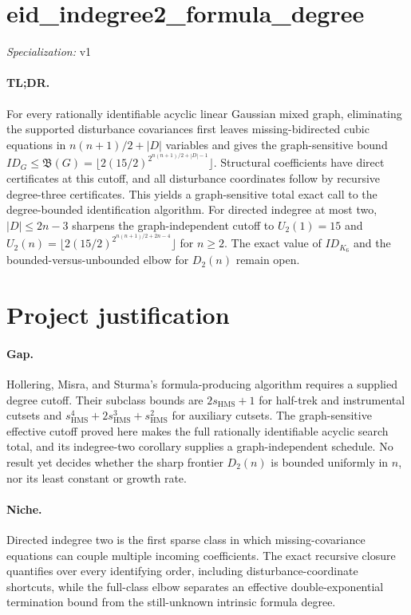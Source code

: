 \documentclass{article}
\begin{document}
\sloppy

\section*{eid\_\allowbreak{}indegree2\_\allowbreak{}formula\_\allowbreak{}degree}

\noindent\textit{Specialization:} v1\par

\paragraph{TL;DR.} For every rationally identifiable acyclic linear Gaussian mixed graph, eliminating the supported disturbance covariances first leaves missing-bidirected cubic equations in \(n(n+1)/2+|D|\) variables and gives the graph-sensitive bound \(ID_G\leq\mathfrak B(G)=\lfloor2(15/2)^{2^{n(n+1)/2+|D|-1}}\rfloor\). Structural coefficients have direct certificates at this cutoff, and all disturbance coordinates follow by recursive degree-three certificates. This yields a graph-sensitive total exact call to the degree-bounded identification algorithm. For directed indegree at most two, \(|D|\leq2n-3\) sharpens the graph-independent cutoff to \(U_2(1)=15\) and \(U_2(n)=\lfloor2(15/2)^{2^{n(n+1)/2+2n-4}}\rfloor\) for \(n\geq2\). The exact value of \(ID_{K_6}\) and the bounded-versus-unbounded elbow for \(D_2(n)\) remain open.

\section{Project justification}

\paragraph{Gap.} Hollering, Misra, and Sturma's formula-producing algorithm requires a supplied degree cutoff. Their subclass bounds are \(2s_{\mathrm{HMS}}+1\) for half-trek and instrumental cutsets and \(s_{\mathrm{HMS}}^4+2s_{\mathrm{HMS}}^3+s_{\mathrm{HMS}}^2\) for auxiliary cutsets. The graph-sensitive effective cutoff proved here makes the full rationally identifiable acyclic search total, and its indegree-two corollary supplies a graph-independent schedule. No result yet decides whether the sharp frontier \(D_2(n)\) is bounded uniformly in \(n\), nor its least constant or growth rate.

\paragraph{Niche.} Directed indegree two is the first sparse class in which missing-covariance equations can couple multiple incoming coefficients. The exact recursive closure quantifies over every identifying order, including disturbance-coordinate shortcuts, while the full-class elbow separates an effective double-exponential termination bound from the still-unknown intrinsic formula degree.
\end{document}
